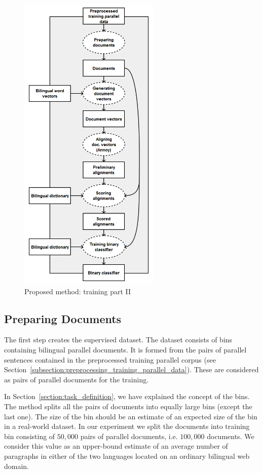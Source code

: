 \begin{figure}[!htb]
	\centering
	\caption{Proposed method: training part II}
	\label{figure:method_2}
	\vspace{1em}
	\includegraphics[width=0.60\textwidth]{images/method_2.png}
\end{figure}

\subsection{Preparing Documents}
\label{subsection:preparing_documents}

The first step creates the supervised dataset. The dataset consists of bins containing bilingual parallel documents. It is formed from the pairs of parallel sentences contained in the preprocessed training parallel corpus (see Section~\ref{subsection:preprocessing_training_parallel_data}). These are considered as pairs of parallel documents for the training.

In Section~\ref{section:task_definition}, we have explained the concept of the bins. The method splits all the pairs of documents into equally large bins (except the last one). The size of the bin should be an estimate of an expected size of the bin in a real-world dataset. In our experiment we split the documents into training bin consisting of $50,000$ pairs of parallel documents, i.e. $100,000$ documents. We consider this value as an upper-bound estimate of an average number of paragraphs in either of the two languages located on an ordinary bilingual web domain.

